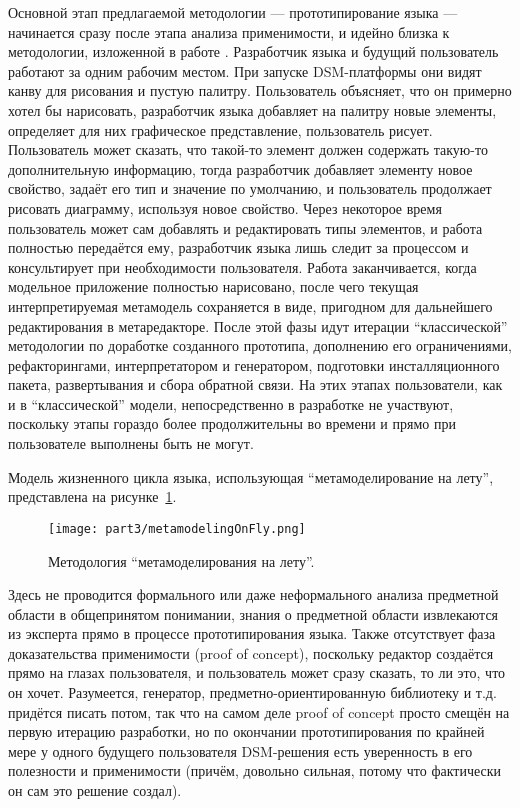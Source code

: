 Основной этап предлагаемой методологии --- прототипирование языка --- начинается сразу 
после этапа анализа применимости, и идейно близка к методологии, изложенной в работе 
\cite{repenning1995agentsheets}. Разработчик языка и будущий пользователь работают 
за одним рабочим местом. При запуске DSM-платформы они видят канву для рисования и 
пустую палитру. Пользователь объясняет, что он примерно хотел бы нарисовать, разработчик 
языка добавляет на палитру новые элементы, определяет для них графическое представление, 
пользователь рисует. Пользователь может сказать, что такой-то элемент должен содержать 
такую-то дополнительную информацию, тогда разработчик добавляет элементу новое свойство, 
задаёт его тип и значение по умолчанию, и пользователь продолжает рисовать диаграмму, 
используя новое свойство. Через некоторое время пользователь может сам добавлять и 
редактировать типы элементов, и работа полностью передаётся ему, разработчик языка 
лишь следит за процессом и консультирует при необходимости пользователя. Работа заканчивается, 
когда модельное приложение полностью нарисовано, после чего текущая интерпретируемая 
метамодель сохраняется в виде, пригодном для дальнейшего редактирования в метаредакторе. 
После этой фазы идут итерации "`классической"' методологии по доработке созданного 
прототипа, дополнению его ограничениями, рефакторингами, интерпретатором и генератором, 
подготовки инсталляционного пакета, развертывания и сбора обратной связи. На этих этапах 
пользователи, как и в "`классической"' модели, непосредственно в разработке не участвуют, 
поскольку этапы гораздо более продолжительны во времени и прямо при пользователе выполнены 
быть не могут.

Модель жизненного цикла языка, использующая "`метамоделирование на лету"', представлена 
на рисунке~\ref{metamodelingOnFly}.

\begin{figure} [ht]
	\begin{center}
		\texttt{[image: part3/metamodelingOnFly.png]}
		\caption{Методология "`метамоделирования на лету"'.}
		\label{metamodelingOnFly}
	\end{center}
\end{figure}

Здесь не проводится формального или даже неформального анализа предметной области в 
общепринятом понимании, знания о предметной области извлекаются из эксперта прямо 
в процессе прототипирования языка. Также отсутствует фаза доказательства применимости 
(proof of concept), поскольку редактор создаётся прямо на глазах пользователя, и пользователь 
может сразу сказать, то ли это, что он хочет. Разумеется, генератор, предметно-ориентированную 
библиотеку и т.д. придётся писать потом, так что на самом деле proof of concept просто 
смещён на первую итерацию разработки, но по окончании прототипирования по крайней мере 
у одного будущего пользователя DSM-решения есть уверенность в его полезности и применимости 
(причём, довольно сильная, потому что фактически он сам это решение создал).

